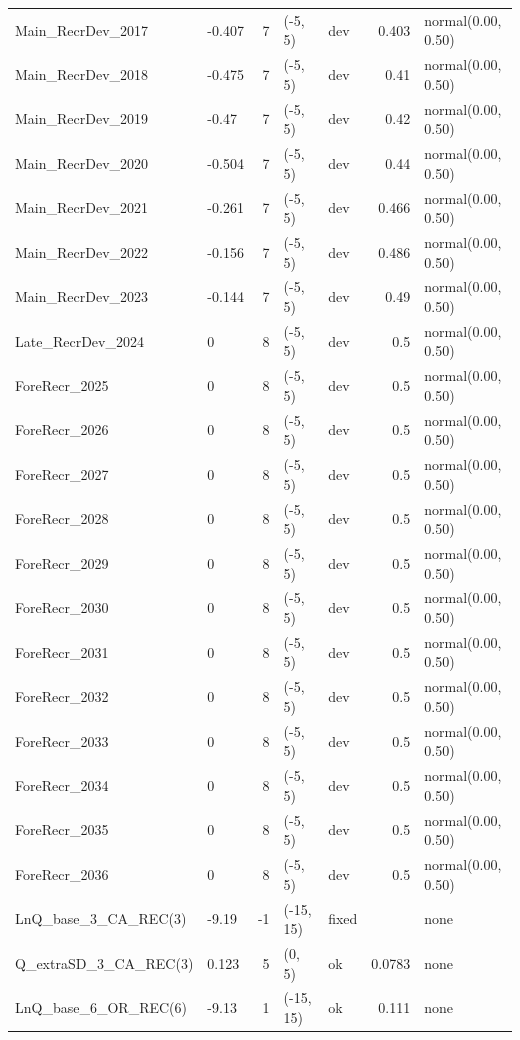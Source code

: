 \documentclass[
]{scrartcl}
\begin{document}
\begin{landscape}
\begin{longtable}{llrllrl}
Main\_RecrDev\_2017 & -0.407 & 7 & (-5, 5) & dev & 0.403 & normal(0.00, 0.50) \\ 
Main\_RecrDev\_2018 & -0.475 & 7 & (-5, 5) & dev & 0.41 & normal(0.00, 0.50) \\ 
Main\_RecrDev\_2019 & -0.47 & 7 & (-5, 5) & dev & 0.42 & normal(0.00, 0.50) \\ 
Main\_RecrDev\_2020 & -0.504 & 7 & (-5, 5) & dev & 0.44 & normal(0.00, 0.50) \\ 
Main\_RecrDev\_2021 & -0.261 & 7 & (-5, 5) & dev & 0.466 & normal(0.00, 0.50) \\ 
Main\_RecrDev\_2022 & -0.156 & 7 & (-5, 5) & dev & 0.486 & normal(0.00, 0.50) \\ 
Main\_RecrDev\_2023 & -0.144 & 7 & (-5, 5) & dev & 0.49 & normal(0.00, 0.50) \\ 
Late\_RecrDev\_2024 & 0 & 8 & (-5, 5) & dev & 0.5 & normal(0.00, 0.50) \\ 
ForeRecr\_2025 & 0 & 8 & (-5, 5) & dev & 0.5 & normal(0.00, 0.50) \\ 
ForeRecr\_2026 & 0 & 8 & (-5, 5) & dev & 0.5 & normal(0.00, 0.50) \\ 
ForeRecr\_2027 & 0 & 8 & (-5, 5) & dev & 0.5 & normal(0.00, 0.50) \\ 
ForeRecr\_2028 & 0 & 8 & (-5, 5) & dev & 0.5 & normal(0.00, 0.50) \\ 
ForeRecr\_2029 & 0 & 8 & (-5, 5) & dev & 0.5 & normal(0.00, 0.50) \\ 
ForeRecr\_2030 & 0 & 8 & (-5, 5) & dev & 0.5 & normal(0.00, 0.50) \\ 
ForeRecr\_2031 & 0 & 8 & (-5, 5) & dev & 0.5 & normal(0.00, 0.50) \\ 
ForeRecr\_2032 & 0 & 8 & (-5, 5) & dev & 0.5 & normal(0.00, 0.50) \\ 
ForeRecr\_2033 & 0 & 8 & (-5, 5) & dev & 0.5 & normal(0.00, 0.50) \\ 
ForeRecr\_2034 & 0 & 8 & (-5, 5) & dev & 0.5 & normal(0.00, 0.50) \\ 
ForeRecr\_2035 & 0 & 8 & (-5, 5) & dev & 0.5 & normal(0.00, 0.50) \\ 
ForeRecr\_2036 & 0 & 8 & (-5, 5) & dev & 0.5 & normal(0.00, 0.50) \\ 
LnQ\_base\_3\_CA\_REC(3) & -9.19 & -1 & (-15, 15) & fixed &  & none \\ 
Q\_extraSD\_3\_CA\_REC(3) & 0.123 & 5 & (0, 5) & ok & 0.0783 & none \\ 
LnQ\_base\_6\_OR\_REC(6) & -9.13 & 1 & (-15, 15) & ok & 0.111 & none \\ 

\end{longtable}
\end{landscape}
\end{document}
